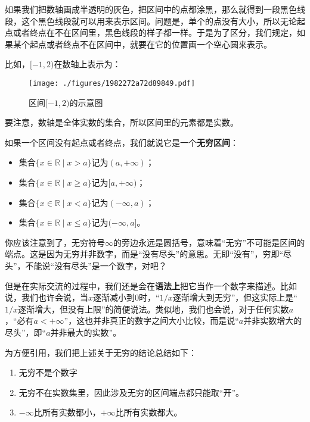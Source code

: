 如果我们把数轴画成半透明的灰色，把区间中的点都涂黑，那么就得到一段黑色线段，这个黑色线段就可以用来表示区间。问题是，单个的点没有大小，所以无论起点或者终点在不在区间里，黑色线段的样子都一样。于是为了区分，我们规定，如果某个起点或者终点不在区间中，就要在它的位置画一个空心圆来表示。

比如，$[-1,2)$在数轴上表示为：

\begin{figure}[ht]
\centering
\texttt{[image: ./figures/1982272a72d89849.pdf]}
\caption{区间$[-1, 2)$的示意图} \label{fig_HsSet_2}
\end{figure}


要注意，数轴是全体实数的集合，所以区间里的元素都是实数。


如果一个区间没有起点或者终点，我们就说它是一个\textbf{无穷区间}：
\begin{itemize}
\item 集合$\{x\in \mathbb{R}\mid x> a\}$记为$(a, +\infty)$；
\item 集合$\{x\in \mathbb{R}\mid x\geq a\}$记为$[a, +\infty)$；
\item 集合$\{x\in \mathbb{R}\mid x< a\}$记为$(-\infty, a)$；
\item 集合$\{x\in \mathbb{R}\mid x\leq a\}$记为$(-\infty, a]$。
\end{itemize}

你应该注意到了，无穷符号$\infty$的旁边永远是圆括号，意味着“无穷”不可能是区间的端点。这是因为无穷并非数字，而是“没有尽头”的意思。无即“没有”，穷即“尽头”，不能说“没有尽头”是一个数字，对吧？

但是在实际交流的过程中，我们还是会在\textbf{语法上}把它当作一个数字来描述。比如说，我们也许会说，当$x$逐渐减小到$0$时，“$1/x$逐渐增大到无穷”，但这实际上是“$1/x$逐渐增大，但没有上限”的简便说法。类似地，我们也会说，对于任何实数$a$，“必有$a<+\infty$”，这也并非真正的数字之间大小比较，而是说“$a$并非实数增大的尽头”，即“$a$并非最大的实数”。

为方便引用，我们把上述关于无穷的结论总结如下：
\begin{enumerate}
\item 无穷不是个数字
\item 无穷不在实数集里，因此涉及无穷的区间端点都只能取“开”。
\item $-\infty$比所有实数都小，$+\infty$比所有实数都大。
\end{enumerate}

